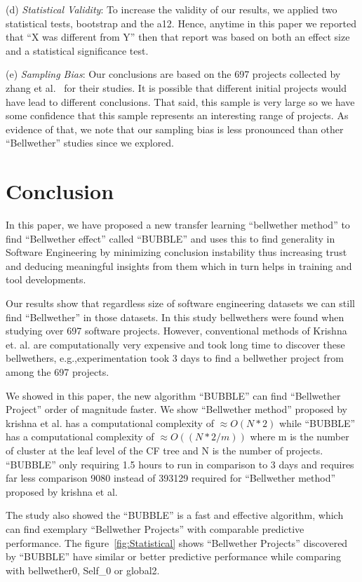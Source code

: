\documentclass[10pt,journal,compsoc]{IEEEtran}
\begin{document}
(d) \textit{Statistical Validity}: To increase the validity of our results, we applied two statistical tests, bootstrap and the a12. Hence, anytime in this paper we reported that ``X was different from Y'' then that report was based on both an effect size and a statistical significance test.
 
(e) \textit{Sampling Bias}: Our conclusions are based on the 697 projects collected by zhang et al.~\cite{zhang15} for their studies. It is possible that different initial projects would have lead to different conclusions. That said, this sample is very large so we have some confidence that this sample represents an interesting range of projects. As evidence of that, we note that our sampling bias is less pronounced than other ``Bellwether'' studies since we explored.
 



\section{Conclusion}
\label{sec:concl}
In this paper, we have proposed a new transfer learning ``bellwether method'' to find ``Bellwether effect'' called ``BUBBLE'' and uses this to find generality in Software Engineering by minimizing conclusion instability thus increasing trust and deducing meaningful insights from them which in turn helps in training and tool developments. 

Our results show that regardless size of software engineering datasets we can still find ``Bellwether'' in those datasets. In this study bellwethers were found when studying over 697 software projects. However, conventional methods of Krishna et. al. are computationally very expensive and took long time to discover these bellwethers, e.g.,experimentation took 3 days to find a bellwether project from among the 697 projects.

We showed in this paper, the new algorithm ``BUBBLE'' can find ``Bellwether Project'' order of magnitude faster. We show ``Bellwether method'' proposed by krishna et al. has a computational complexity of $\approx O(N*2)$ while ``BUBBLE'' has a computational complexity of $\approx O((N*2/m))$ where m is the number of cluster at the leaf level of the CF tree and N is the number of projects. ``BUBBLE'' only requiring 1.5 hours to run in comparison to 3 days and requires far less comparison 9080 instead of 393129 required for ``Bellwether method'' proposed by krishna et al.

The study also showed the ``BUBBLE'' is a fast and effective algorithm, which can find exemplary ``Bellwether Projects'' with comparable predictive performance. The figure~\ref{fig:Statistical} shows ``Bellwether Projects'' discovered by ``BUBBLE'' have similar or better predictive performance while comparing with bellwether0, Self\_0 or global2. 
\end{document}

